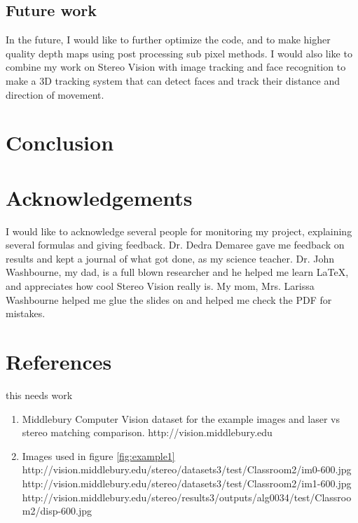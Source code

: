 \documentclass[11pt,fleqn]{article}
\begin{document}
\subsection{Future work}

In the future, I would like to further optimize the code, and to make higher quality depth maps using post processing sub pixel methods. I would also like to combine my work on Stereo Vision with image tracking and face recognition to make a 3D tracking system that can detect faces and track their distance and direction of movement.

\section{Conclusion}


\section{Acknowledgements}

I would like to acknowledge several people for monitoring my project, explaining several formulas and giving feedback.
Dr. Dedra Demaree gave me feedback on results and kept a journal of what got done, as my science teacher. Dr. John Washbourne, my dad, is a full blown researcher and he helped me learn LaTeX, and appreciates how cool Stereo Vision really is. My mom, Mrs. Larissa Washbourne helped me glue the slides on and helped me check the PDF for mistakes.

\section{References}

this needs work

\begin{enumerate}

\item Middlebury Computer Vision dataset for the example images and laser vs stereo matching comparison.  
\small
http://vision.middlebury.edu
\normalsize

\item Images used in figure \ref{fig:example1}\\  
\small
http://vision.middlebury.edu/stereo/datasets3/test/Classroom2/im0-600.jpg\\
http://vision.middlebury.edu/stereo/datasets3/test/Classroom2/im1-600.jpg\\
http://vision.middlebury.edu/stereo/results3/outputs/alg0034/test/Classroom2/disp-600.jpg
\normalsize

\end{enumerate}
\end{document}
